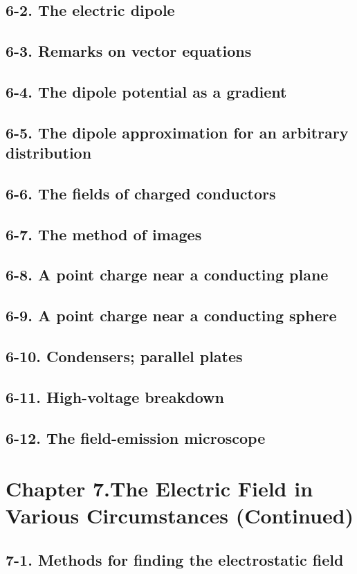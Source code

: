 \documentclass{article}
\begin{document}
\subsection{6-2. The electric dipole}
\subsection{6-3. Remarks on vector equations}
\subsection{6-4. The dipole potential as a gradient}
\subsection{6-5. The dipole approximation for an arbitrary distribution}
\subsection{6-6. The fields of charged conductors}
\subsection{6-7. The method of images}
\subsection{6-8. A point charge near a conducting plane}
\subsection{6-9. A point charge near a conducting sphere}
\subsection{6-10. Condensers; parallel plates}
\subsection{6-11. High-voltage breakdown}
\subsection{6-12. The field-emission microscope}
\section{Chapter 7.The Electric Field in Various Circumstances (Continued)}
\subsection{7-1. Methods for finding the electrostatic field}
\end{document}
